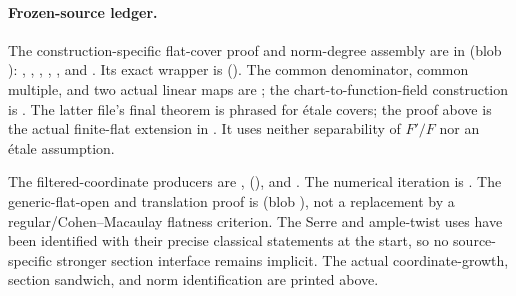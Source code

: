 \paragraph{Frozen-source ledger.}
The construction-specific flat-cover proof and norm-degree
assembly are in
\href{https://github.com/ChristianKudeba/alpoge-rh-verification/blob/alpoge-source-7cbf7a0c/src/Development/WeilBound/CoreStatements/TorusUniformisation/ChowMahlerFamilies/DegreeMultiplicationNorm.lean}
{}
(blob ):
, ,
, ,
, and .
Its exact wrapper is
().
The common denominator, common multiple, and two actual
linear maps are
;
the chart-to-function-field construction is
.
The latter file's final theorem is phrased for \'etale
covers; the  proof above is the actual
finite-flat extension in .
It uses neither separability of \(F'/F\) nor an \'etale
assumption.

The filtered-coordinate producers are
,
(), and
.
The numerical iteration is
.
The generic-flat-open and translation proof is
(blob ),
not a replacement by a regular/Cohen--Macaulay flatness criterion.
The Serre and ample-twist uses have been identified with
their precise classical statements at the start, so no
source-specific stronger section interface remains implicit.
The actual coordinate-growth, section sandwich, and norm
identification are printed above.
